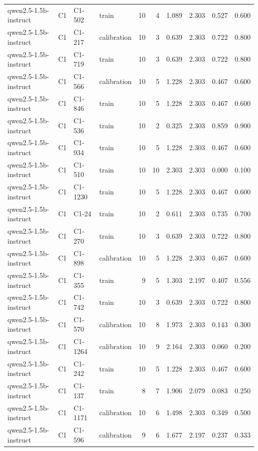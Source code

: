 \begin{table}
\begin{tabular}{llllrrrrrr}
qwen2.5-1.5b-instruct & C1 & C1-502 & train & 10 & 4 & 1.089 & 2.303 & 0.527 & 0.600 \\
qwen2.5-1.5b-instruct & C1 & C1-217 & calibration & 10 & 3 & 0.639 & 2.303 & 0.722 & 0.800 \\
qwen2.5-1.5b-instruct & C1 & C1-719 & train & 10 & 3 & 0.639 & 2.303 & 0.722 & 0.800 \\
qwen2.5-1.5b-instruct & C1 & C1-566 & calibration & 10 & 5 & 1.228 & 2.303 & 0.467 & 0.600 \\
qwen2.5-1.5b-instruct & C1 & C1-846 & train & 10 & 5 & 1.228 & 2.303 & 0.467 & 0.600 \\
qwen2.5-1.5b-instruct & C1 & C1-536 & train & 10 & 2 & 0.325 & 2.303 & 0.859 & 0.900 \\
qwen2.5-1.5b-instruct & C1 & C1-934 & train & 10 & 5 & 1.228 & 2.303 & 0.467 & 0.600 \\
qwen2.5-1.5b-instruct & C1 & C1-510 & train & 10 & 10 & 2.303 & 2.303 & 0.000 & 0.100 \\
qwen2.5-1.5b-instruct & C1 & C1-1230 & train & 10 & 5 & 1.228 & 2.303 & 0.467 & 0.600 \\
qwen2.5-1.5b-instruct & C1 & C1-24 & train & 10 & 2 & 0.611 & 2.303 & 0.735 & 0.700 \\
qwen2.5-1.5b-instruct & C1 & C1-270 & train & 10 & 3 & 0.639 & 2.303 & 0.722 & 0.800 \\
qwen2.5-1.5b-instruct & C1 & C1-898 & calibration & 10 & 5 & 1.228 & 2.303 & 0.467 & 0.600 \\
qwen2.5-1.5b-instruct & C1 & C1-355 & train & 9 & 5 & 1.303 & 2.197 & 0.407 & 0.556 \\
qwen2.5-1.5b-instruct & C1 & C1-742 & train & 10 & 3 & 0.639 & 2.303 & 0.722 & 0.800 \\
qwen2.5-1.5b-instruct & C1 & C1-570 & calibration & 10 & 8 & 1.973 & 2.303 & 0.143 & 0.300 \\
qwen2.5-1.5b-instruct & C1 & C1-1264 & calibration & 10 & 9 & 2.164 & 2.303 & 0.060 & 0.200 \\
qwen2.5-1.5b-instruct & C1 & C1-242 & train & 10 & 5 & 1.228 & 2.303 & 0.467 & 0.600 \\
qwen2.5-1.5b-instruct & C1 & C1-137 & train & 8 & 7 & 1.906 & 2.079 & 0.083 & 0.250 \\
qwen2.5-1.5b-instruct & C1 & C1-1171 & calibration & 10 & 6 & 1.498 & 2.303 & 0.349 & 0.500 \\
qwen2.5-1.5b-instruct & C1 & C1-596 & calibration & 9 & 6 & 1.677 & 2.197 & 0.237 & 0.333 \\

\end{tabular}
\end{table}
